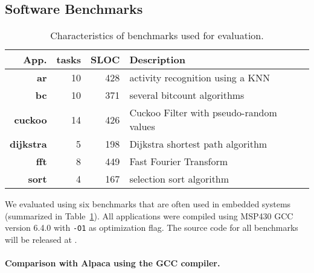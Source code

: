 \subsection{Software Benchmarks}
\label{sec:software_benchmarks}

\begin{table}
	\centering
	\footnotesize
	\begin{tabular}{| r|r|r | p{} |}
		\hline
		App.&tasks&SLOC&Description\\
		\hline\hline
        \textbf{ar} &10 &428 & activity recognition using a KNN\\ %
		\hline
        \textbf{bc} &10 &371 & several bitcount algorithms\\
		\hline
                \textbf{cuckoo} &14 &426 & Cuckoo Filter with pseudo-random values\\
		\hline
        \textbf{dijkstra} &5 &198 & Dijkstra shortest path algorithm \\
		\hline
        \textbf{fft} &8 &449 & Fast Fourier Transform\\ %
		\hline
		\textbf{sort} &4 &167 & selection sort algorithm\\
		\hline
	\end{tabular}
\caption{Characteristics of benchmarks used for evaluation.}
\label{table:benchmark_table}
\end{table}

We evaluated \sys using six benchmarks that are often used in embedded systems (summarized in Table~\ref{table:benchmark_table}). All applications were compiled using MSP430 GCC~\cite{ti-gcc} version 6.4.0 with \texttt{-O1} as optimization flag. The source code for all benchmarks will be released at \cite{coala_website}.

\paragraph{Comparison with Alpaca using the GCC compiler.}

